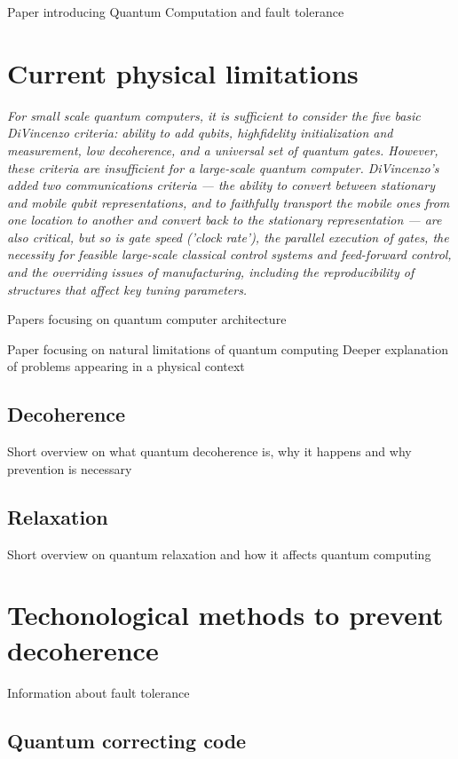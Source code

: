 Paper introducing Quantum Computation and fault tolerance \cite{2015arXiv150803695P}
\section{Current physical limitations}

\textit{For small scale quantum computers, it is sufficient to consider the five basic DiVincenzo criteria: ability to add qubits, highfidelity initialization and measurement, low decoherence, and a universal set of quantum gates. However, these criteria are insufficient for a large-scale quantum computer. DiVincenzo’s added two communications criteria — the ability to convert between stationary and mobile qubit representations, and to faithfully transport the mobile ones from one location to another and convert back to the stationary representation — are also critical, but so is gate speed ('clock rate'), the parallel execution of gates, the necessity for feasible large-scale classical control systems and feed-forward control, and the overriding issues of manufacturing, including the reproducibility of structures that affect key tuning parameters.} \cite{2009arXiv0906.2686V}

Papers focusing on quantum computer architecture  \cite{2012PhRvX...2c1007J}

Paper focusing on natural limitations of quantum computing
Deeper explanation of problems appearing in a physical context
\subsection{Decoherence}
Short overview on what quantum decoherence is, why it happens and why prevention is necessary
\subsection{Relaxation}
Short overview on quantum relaxation and how it affects quantum computing

\section{Techonological methods to prevent decoherence}

Information about fault tolerance \cite{2015arXiv150803695P}
\subsection{Quantum correcting code}

